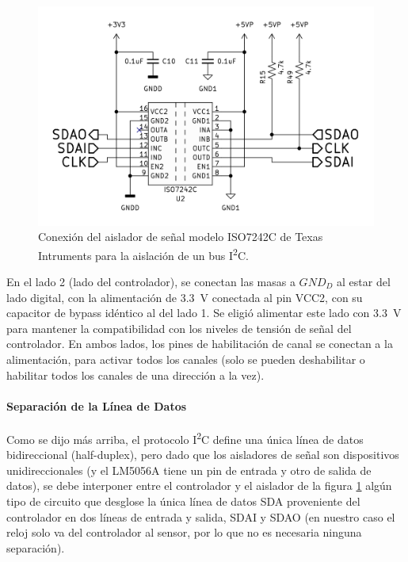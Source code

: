 \begin{figure}[h]
    \centering
    \includegraphics[scale=1.1]{Imagenes/Conexion ISO7242C.png}
    \caption{Conexión del aislador de señal modelo ISO7242C de Texas Intruments para la aislación de un bus I\textsuperscript{2}C.}
    \label{conexion_ISO7242C}
\end{figure}

En el lado 2 (lado del controlador), se conectan las masas a $GND_D$ al estar del lado digital, con la alimentación de \SI[]{3.3}[]{\volt} conectada al pin VCC2, con su capacitor de bypass idéntico al del lado 1. Se eligió alimentar este lado con \SI[]{3.3}[]{\volt} para mantener la compatibilidad con los niveles de tensión de señal del controlador. En ambos lados, los pines de habilitación de canal se conectan a la alimentación, para activar todos los canales (solo se pueden deshabilitar o habilitar todos los canales de una dirección a la vez).\\

\paragraph{Separación de la Línea de Datos}

Como se dijo más arriba, el protocolo I\textsuperscript{2}C define una única línea de datos bidireccional (half-duplex), pero dado que los aisladores de señal son dispositivos unidireccionales (y el LM5056A tiene un pin de entrada y otro de salida de datos), se debe interponer entre el controlador y el aislador de la figura \ref{conexion_ISO7242C} algún tipo de circuito que desglose la única línea de datos SDA proveniente del controlador en dos líneas de entrada y salida, SDAI y SDAO (en nuestro caso el reloj solo va del controlador al sensor, por lo que no es necesaria ninguna separación).\\

